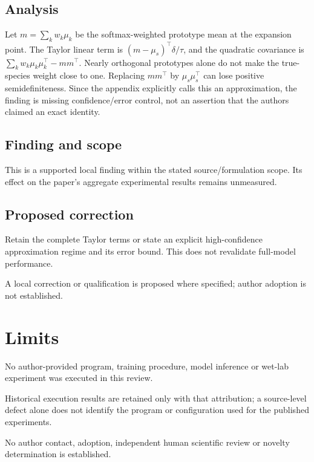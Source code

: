 \documentclass[11pt]{article}
\begin{document}
\subsection*{Analysis}

Let \(m=\sum_k w_k\mu_k\) be the softmax-weighted prototype mean at the expansion point. The Taylor linear term is \((m-\mu_s)^\top\delta/\tau\), and the quadratic covariance is \(\sum_k w_k\mu_k\mu_k^\top-mm^\top\). Nearly orthogonal prototypes alone do not make the true-species weight close to one. Replacing \(mm^\top\) by \(\mu_s\mu_s^\top\) can lose positive semidefiniteness. Since the appendix explicitly calls this an approximation, the finding is missing confidence/error control, not an assertion that the authors claimed an exact identity.

\subsection*{Finding and scope}

This is a supported local finding within the stated source/formulation scope. Its effect on the paper's aggregate experimental results remains unmeasured.

\subsection*{Proposed correction}

Retain the complete Taylor terms or state an explicit high-confidence approximation regime and its error bound. This does not revalidate full-model performance.

A local correction or qualification is proposed where specified; author adoption is not established.

\section*{Limits}

No author-provided program, training procedure, model inference or wet-lab experiment was executed in this review.\par

Historical execution results are retained only with that attribution; a source-level defect alone does not identify the program or configuration used for the published experiments.\par

No author contact, adoption, independent human scientific review or novelty determination is established.\par
\end{document}
